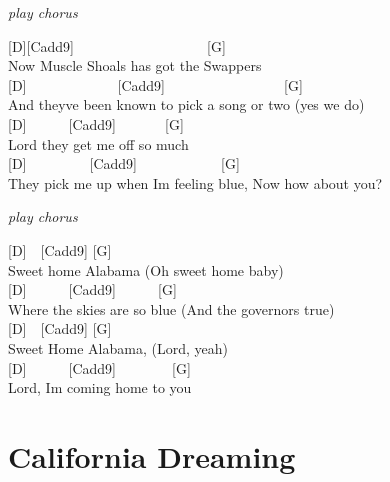 \documentclass[
  letterpaper,
  a5paper]{memoir}
\begin{document}
\emph{play chorus}

{[}D{]}{[}Cadd9{]}~~~~~~~~~~~~~~~~~~~{[}G{]}\\
Now Muscle Shoals has got the Swappers\\
{[}D{]}~~~~~~~~~~~~~{[}Cadd9{]}~~~~~~~~~~~~~~~~~{[}G{]}\\
And they\textquotesingle ve been known to pick a song or two (yes we
do)\\
{[}D{]}~~~~~~{[}Cadd9{]}~~~~~~~{[}G{]}\\
Lord they get me off so much\\
{[}D{]}~~~~~~~~~{[}Cadd9{]}~~~~~~~~~~~~{[}G{]}~~~\\
They pick me up when I\textquotesingle m feeling blue, Now how about
you?

\emph{play chorus}

{[}D{]}~~{[}Cadd9{]} {[}G{]}~~~~~\\
Sweet home Alabama (Oh sweet home baby)\\
{[}D{]}~~~~~~{[}Cadd9{]}~~~~~~{[}G{]}~~~\\
Where the skies are so blue (And the governor\textquotesingle s true)\\
{[}D{]}~~{[}Cadd9{]} {[}G{]}\\
Sweet Home Alabama, (Lord, yeah)\\
{[}D{]}~~~~~~{[}Cadd9{]}~~~~~~~~{[}G{]}\\
Lord, I\textquotesingle m coming home to you

\hypertarget{california-dreaming}{%
\chapter{California Dreaming}\label{california-dreaming}}
\end{document}
